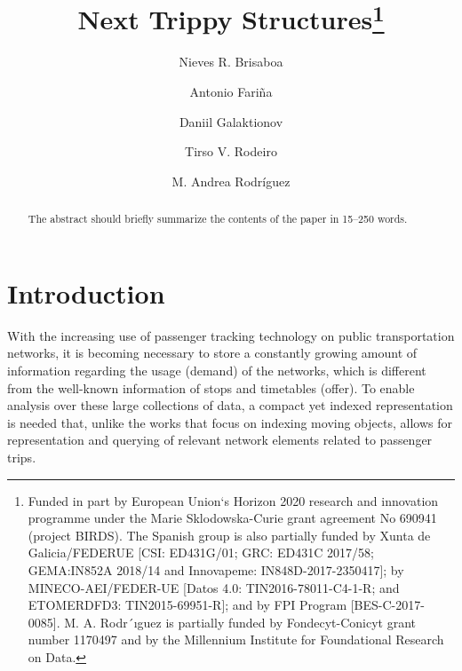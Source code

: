 \documentclass[runningheads]{llncs}
\begin{document}
%
\title{Next Trippy Structures\thanks{Funded in part by European Union`s Horizon 2020 research and innovation programme
under the Marie Sklodowska-Curie grant agreement No 690941 (project
BIRDS). The Spanish group is also partially funded by Xunta de Galicia/FEDERUE
[CSI: ED431G/01; GRC: ED431C 2017/58; GEMA:IN852A
2018/14 and Innovapeme: IN848D-2017-2350417]; by MINECO-AEI/FEDER-UE
[Datos 4.0: TIN2016-78011-C4-1-R; and ETOMERDFD3:
TIN2015-69951-R]; and by FPI Program [BES-C-2017-0085]. M. A. Rodr´ıguez is
partially funded by Fondecyt-Conicyt grant number 1170497 and by the Millennium
Institute for Foundational Research on Data. }}
%
%
\author{Nieves R. Brisaboa \and
Antonio Fari\~na\and
Daniil Galaktionov \and Tirso V. Rodeiro \and M. Andrea Rodr\'iguez}
%
%
%
\maketitle              %
%
\begin{abstract}
The abstract should briefly summarize the contents of the paper in
15--250 words.

\end{abstract}
%
%
%
\section{Introduction}
With the increasing use of passenger tracking technology on public transportation networks, it is becoming necessary to store a constantly growing amount of information regarding the usage (demand) of the networks, which is different from the well-known information of stops and timetables (offer). To enable analysis over these large collections of data, a compact yet indexed representation is needed that, unlike the works that focus on indexing moving objects, allows for representation and querying of relevant network elements related to passenger trips.
\end{document}
